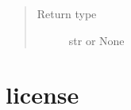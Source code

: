 \documentclass[letterpaper,10pt,english]{sphinxmanual}
\begin{document}
\begin{fulllineitems}
\begin{fulllineitems}
\begin{quote}
\begin{description}
\begin{description}
\end{description}


\item[{Return type}] \leavevmode
str or None

\end{description}\end{quote}

\end{fulllineitems}


\end{fulllineitems}



\chapter{license}
\label{\detokenize{licenses:license}}\label{\detokenize{licenses::doc}}
\end{document}
